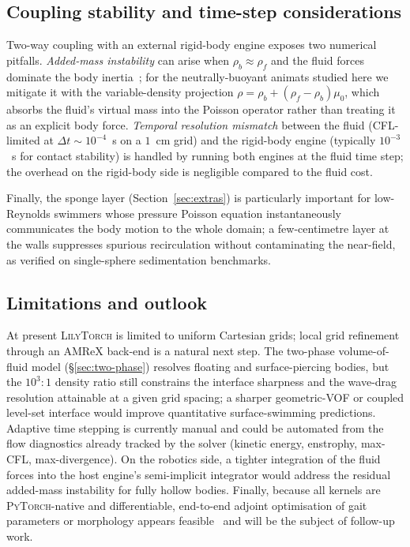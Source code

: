 \documentclass[journal,twoside,10pt]{IEEEtran}
\newcommand{\lilytorch}{\textsc{LilyTorch}\xspace}
\newcommand{\pytorch}{\textsc{PyTorch}\xspace}
\begin{document}
\subsection{Coupling stability and time-step considerations}

Two-way coupling with an external rigid-body engine exposes two numerical pitfalls.
\emph{Added-mass instability} can arise when $\rho_b\!\approx\!\rho_f$
and the fluid forces dominate the body inertia~\cite{causin2005added};
for the neutrally-buoyant animats studied here we mitigate it with
the variable-density projection
$\rho=\rho_b+(\rho_f-\rho_b)\mu_0$, which absorbs the fluid's
virtual mass into the Poisson operator rather than treating it as an
explicit body force.  \emph{Temporal resolution mismatch}
between the fluid (CFL-limited at $\Delta t\!\sim\!10^{-4}$~s on a
$1$~cm grid) and the rigid-body engine (typically $10^{-3}$~s for contact
stability) is handled by running both engines at the fluid time
step; the overhead on the rigid-body side is negligible compared to
the fluid cost.

Finally, the sponge layer (Section~\ref{sec:extras}) is particularly
important for low-Reynolds swimmers whose pressure Poisson equation
instantaneously communicates the body motion to the whole domain; a
few-centimetre layer at the walls suppresses spurious recirculation
without contaminating the near-field, as verified on single-sphere
sedimentation benchmarks.


\subsection{Limitations and outlook}

At present \lilytorch is limited to uniform Cartesian grids; local
grid refinement through an AMReX back-end is a natural next step.  The
two-phase volume-of-fluid model (§\ref{sec:two-phase}) resolves
floating and surface-piercing bodies, but the $10^3{:}1$ density ratio
still constrains the interface sharpness and the wave-drag resolution
attainable at a given grid spacing; a sharper geometric-VOF or coupled
level-set interface would improve quantitative surface-swimming
predictions.  Adaptive time stepping is
currently manual and could be automated from the flow diagnostics
already tracked by the solver (kinetic energy, enstrophy, max-CFL,
max-divergence).  On the robotics side, a tighter integration of the
fluid forces into the host engine's semi-implicit integrator would address
the residual added-mass instability for fully hollow bodies.  Finally,
because all kernels are \pytorch-native and differentiable, end-to-end
adjoint optimisation of gait parameters or morphology appears
feasible~\cite{kochkov2021machinelearned,brunton2020machine} and will
be the subject of follow-up work.
\end{document}
